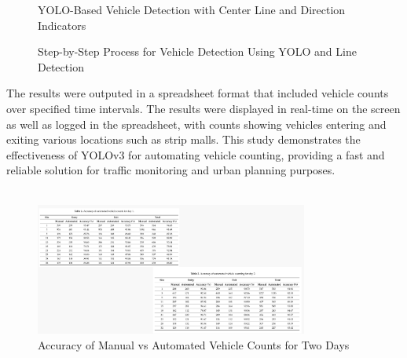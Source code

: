 {\begin{figure}[h!]
    \caption{YOLO-Based Vehicle Detection with Center Line and Direction Indicators}
\end{figure}
%
%
\begin{figure}[h!]
    \centering
    \caption{Step-by-Step Process for Vehicle Detection Using YOLO and Line Detection}
\end{figure}
%
%
The results were outputed in a spreadsheet format that included vehicle counts over specified time intervals. The results were displayed in real-time on the screen as well as logged in the spreadsheet, with counts showing vehicles entering and exiting various locations such as strip malls. This study demonstrates the effectiveness of YOLOv3 for automating vehicle counting, providing a fast and reliable solution for traffic monitoring and urban planning purposes.\\\\
%
%
\begin{figure}[h!]
    \centering
    \includegraphics[width=0.8\textwidth]{images/Paper 3 Result.png}
    \caption{Accuracy of Manual vs Automated Vehicle Counts for Two Days}

\end{figure}}

